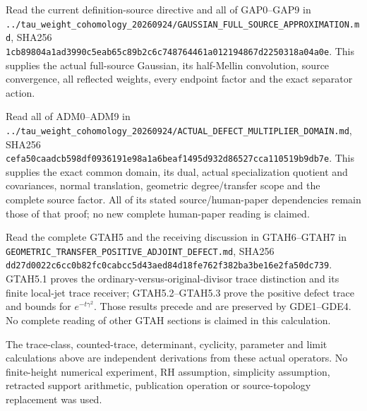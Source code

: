 Read the current definition-source directive and all of GAP0--GAP9 in
\nolinkurl{../tau_weight_cohomology_20260924/GAUSSIAN_FULL_SOURCE_APPROXIMATION.md},
SHA256
\nolinkurl{1cb89804a1ad3990c5eab65c89b2c6c748764461a012194867d2250318a04a0e}.
This supplies the actual full-source Gaussian, its half-Mellin
convolution, source convergence, all reflected weights, every endpoint
factor and the exact separator action.

Read all of ADM0--ADM9 in
\nolinkurl{../tau_weight_cohomology_20260924/ACTUAL_DEFECT_MULTIPLIER_DOMAIN.md},
SHA256
\nolinkurl{cefa50caadcb598df0936191e98a1a6beaf1495d932d86527cca110519b9db7e}.
This supplies the exact common domain, its dual, actual specialization
quotient and covariances, normal translation, geometric degree/transfer
scope and the complete source factor. All of its stated
source/human-paper dependencies remain those of that proof; no new
complete human-paper reading is claimed.

Read the complete GTAH5 and the receiving discussion in GTAH6--GTAH7 in
\nolinkurl{GEOMETRIC_TRANSFER_POSITIVE_ADJOINT_DEFECT.md}, SHA256
\nolinkurl{dd27d0022c6cc0b82fc0cabcc5d43aed84d18fe762f382ba3be16e2fa50dc739}.
GTAH5.1 proves the ordinary-versus-original-divisor trace distinction
and its finite local-jet trace receiver; GTAH5.2--GTAH5.3 prove the
positive defect trace and bounds for \(e^{-t\gamma^2}\). Those results
precede and are preserved by GDE1--GDE4. No complete reading of other
GTAH sections is claimed in this calculation.

The trace-class, counted-trace, determinant, cyclicity, parameter and
limit calculations above are independent derivations from these actual
operators. No finite-height numerical experiment, RH assumption,
simplicity assumption, retracted support arithmetic, publication
operation or source-topology replacement was used.
